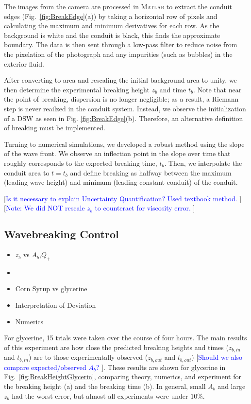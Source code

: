 \documentclass{jfm}
\newcommand{\MM}[1]{[\textcolor{blue}{#1 }]}
\begin{document}
    The images from the camera are processed in \textsc{Matlab} to extract the conduit edges (Fig.~\ref{fig:BreakEdge}(a)) by taking a horizontal row of pixels and calculating the maximum and minimum derivatives for each row.
    As the background is white and the conduit is black, this finds the approximate boundary.
    The data is then sent through a low-pass filter to reduce noise from the pixelation of the photograph and any impurities (such as bubbles) in the exterior fluid.
    
	After converting to area and rescaling the initial background area to unity, we then determine the experimental breaking height $z_b$ and time $t_b$. Note that near the point of breaking, dispersion is no longer negligible; as a result, a Riemann step is never reailzed in the conduit system. Instead, we observe the initialization of a DSW as seen in Fig. \ref{fig:BreakEdge}(b). Therefore, an alternative definition of breaking must be implemented.
	
	Turning to numerical simulations, we developed a robust method using the slope of the wave front. We observe an inflection point in the slope over time that roughly corresponds to the expected breaking time, $t_b$.
	Then, we interpolate the conduit area to $t=t_b$ and define breaking as halfway between the maximum (leading wave height) and minimum (leading constant conduit) of the conduit.

    \MM{Is it necessary to explain Uncertainty Quantification? Used textbook method.}
    \MM{Note: We did NOT rescale $z_b$ to counteract for viscosity error.}

\subsection{Wavebreaking Control}
	\begin{itemize}
	    \item $z_b$ vs $A_b$,$Q_+$
	    \item \MM{$t_b$ vs the same}
	    \item Corn Syrup vs glycerine
	    \item Interpretation of Deviation
	    \item Numerics
	\end{itemize}
	For glycerine, 15 trials were taken over the course of four hours. The main results of this experiment are how close the predicted breaking heights and times  ($z_{b,in}$ and $t_{b,in}$) are to those experimentally observed ($z_{b,out}$ and $t_{b,out}$) \MM{Should we also compare expected/observed $A_b$?}. These results are shown for glycerine in Fig.~\ref{fig:BreakHeightGlycerin}, comparing theory, numerics, and experiment for the breaking height (a) and the breaking time (b). In general, small $A_b$ and large $z_b$ had the worst error, but almost all experiments were under $10\%$.
    	
\end{document}
